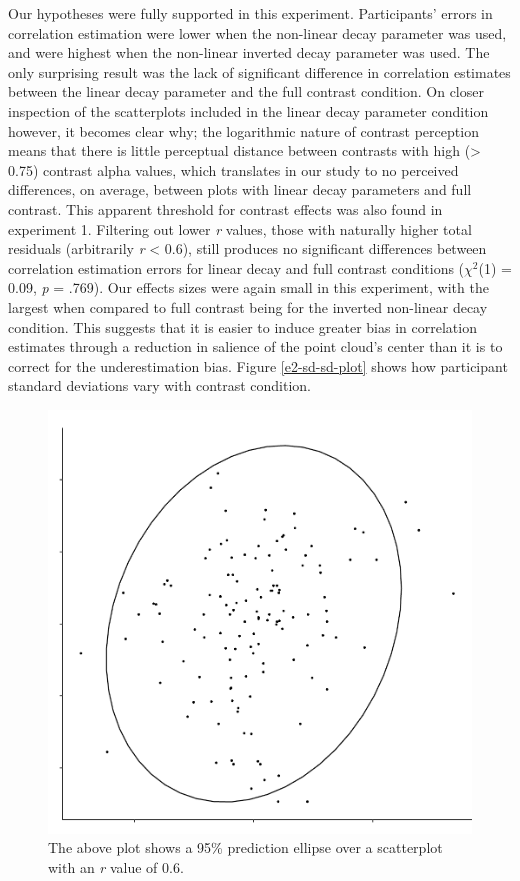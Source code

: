 \documentclass[preprint, 3p,
authoryear]{elsarticle} %
\begin{document}
Our hypotheses were fully supported in this experiment. Participants'
errors in correlation estimation were lower when the non-linear decay
parameter was used, and were highest when the non-linear inverted decay
parameter was used. The only surprising result was the lack of
significant difference in correlation estimates between the linear decay
parameter and the full contrast condition. On closer inspection of the
scatterplots included in the linear decay parameter condition however,
it becomes clear why; the logarithmic nature of contrast perception
\citep{varshney_2013, fechner_1948} means that there is little
perceptual distance between contrasts with high (\textgreater{} 0.75)
contrast alpha values, which translates in our study to no perceived
differences, on average, between plots with linear decay parameters and
full contrast. This apparent threshold for contrast effects was also
found in experiment 1. Filtering out lower \emph{r} values, those with
naturally higher total residuals (arbitrarily \emph{r} \textless{} 0.6),
still produces no significant differences between correlation estimation
errors for linear decay and full contrast conditions (\(\chi^2\)(1) =
0.09, \emph{p} = .769). Our effects sizes were again small in this
experiment, with the largest when compared to full contrast being for
the inverted non-linear decay condition. This suggests that it is easier
to induce greater bias in correlation estimates through a reduction in
salience of the point cloud's center than it is to correct for the
underestimation bias. Figure \ref{e2-sd-sd-plot} shows how participant
standard deviations vary with contrast condition.

\begin{figure}

\includegraphics[width=0.5\linewidth]{contrast_and_scatterplots_files/figure-latex/prediction-ellipse-1} \hfill{}

\caption{\label{prediction-ellipse}The above plot shows a 95\% prediction ellipse over a scatterplot with an \textit{r} value of 0.6.}\label{fig:prediction-ellipse}
\end{figure}
\end{document}
